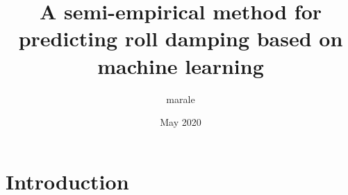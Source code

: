 \documentclass{article}
\title{A semi-empirical method for predicting roll damping based on machine learning}
\author{marale }
\date{May 2020}
\begin{document}
\maketitle

\section{Introduction}
\end{document}
